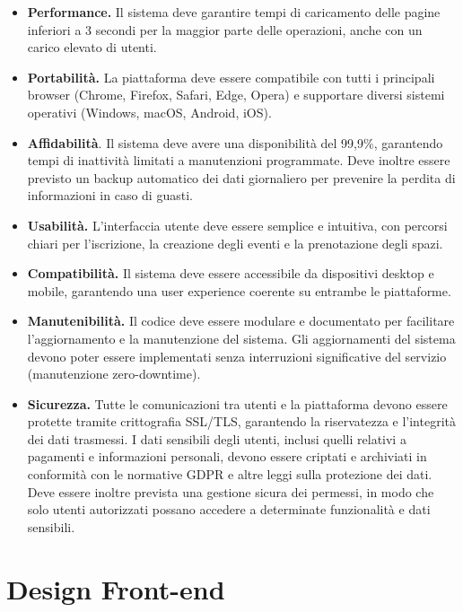 \documentclass[9pt]{extarticle}
\begin{document}
\begin{itemize}
	\item \NONFUNC \textbf{Performance.} Il sistema deve garantire tempi di caricamento delle pagine inferiori a 3 secondi per la maggior parte delle operazioni, anche con un carico elevato di utenti.
	\item \NONFUNC \textbf{Portabilità.} La piattaforma deve essere compatibile con tutti i principali browser (Chrome, Firefox, Safari, Edge, Opera) e supportare diversi sistemi operativi (Windows, macOS, Android, iOS).
	\item \NONFUNC\textbf{Affidabilità}. Il sistema deve avere una disponibilità del 99,9\%, garantendo tempi di inattività limitati a manutenzioni programmate. Deve inoltre essere previsto un backup automatico dei dati giornaliero per prevenire la perdita di informazioni in caso di guasti.
	\item \NONFUNC\textbf{Usabilità.} L’interfaccia utente deve essere semplice e intuitiva, con percorsi chiari per l’iscrizione, la creazione degli eventi e la prenotazione degli spazi.
	
    \item \NONFUNC\textbf{Compatibilità.} Il sistema deve essere accessibile da dispositivi desktop e mobile, garantendo una user experience coerente su entrambe le piattaforme.
	\item \NONFUNC\textbf{Manutenibilità.} Il codice deve essere modulare e documentato per facilitare l'aggiornamento e la manutenzione del sistema. Gli aggiornamenti del sistema devono poter essere implementati senza interruzioni significative del servizio (manutenzione zero-downtime).
    \item \NONFUNC\textbf{Sicurezza.} Tutte le comunicazioni tra utenti e la piattaforma devono essere protette tramite crittografia SSL/TLS, garantendo la riservatezza e l’integrità dei dati trasmessi. I dati sensibili degli utenti, inclusi quelli relativi a pagamenti e informazioni personali, devono essere criptati e archiviati in conformità con le normative GDPR e altre leggi sulla protezione dei dati. Deve essere inoltre prevista una gestione sicura dei permessi, in modo che solo utenti autorizzati possano accedere a determinate funzionalità e dati sensibili.
\end{itemize}


\section{Design Front-end}
\end{document}
